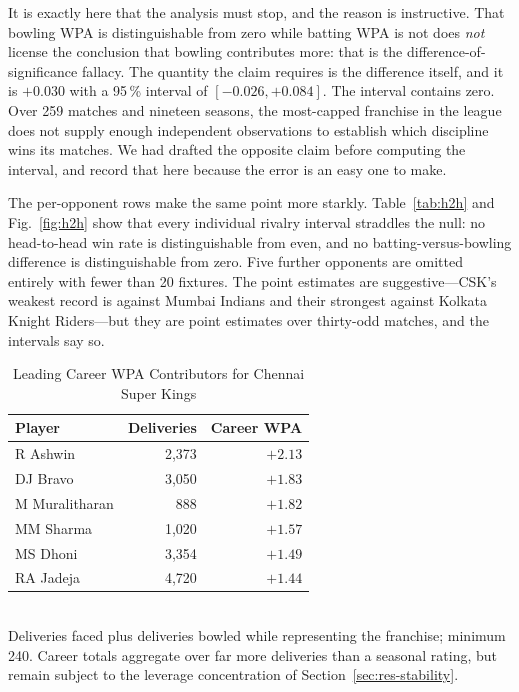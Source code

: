\documentclass[conference]{IEEEtran}
\begin{document}
It is exactly here that the analysis must stop, and the reason is
instructive. That bowling WPA is distinguishable from zero while batting
WPA is not does \emph{not} license the conclusion that bowling
contributes more: that is the difference-of-significance fallacy. The
quantity the claim requires is the difference itself, and it is
$+0.030$ with a 95\,\% interval of $[-0.026, +0.084]$. The interval
contains zero. Over 259 matches and nineteen seasons, the most-capped
franchise in the league does not supply enough independent observations
to establish which discipline wins its matches. We had drafted the
opposite claim before computing the interval, and record that here
because the error is an easy one to make.

The per-opponent rows make the same point more starkly.
Table~\ref{tab:h2h} and Fig.~\ref{fig:h2h} show that every individual
rivalry interval straddles the null: no head-to-head win rate is
distinguishable from even, and no batting-versus-bowling difference is
distinguishable from zero. Five further opponents are omitted entirely
with fewer than 20 fixtures. The point estimates are suggestive---CSK's
weakest record is against Mumbai Indians and their strongest against
Kolkata Knight Riders---but they are point estimates over thirty-odd
matches, and the intervals say so.

\begin{table}[htbp]
\caption{Leading Career WPA Contributors for Chennai Super Kings}
\label{tab:cskplayers}
\centering
\begin{tabular}{lrr}
\toprule
\textbf{Player} & \textbf{Deliveries} & \textbf{Career WPA} \\
\midrule
R Ashwin & 2{,}373 & $+2.13$ \\
DJ Bravo & 3{,}050 & $+1.83$ \\
M Muralitharan & 888 & $+1.82$ \\
MM Sharma & 1{,}020 & $+1.57$ \\
MS Dhoni & 3{,}354 & $+1.49$ \\
RA Jadeja & 4{,}720 & $+1.44$ \\
\bottomrule
\end{tabular}
\\[2pt]\footnotesize Deliveries faced plus deliveries bowled while
representing the franchise; minimum 240. Career totals aggregate over far
more deliveries than a seasonal rating, but remain subject to the
leverage concentration of Section~\ref{sec:res-stability}.
\end{table}
\end{document}
